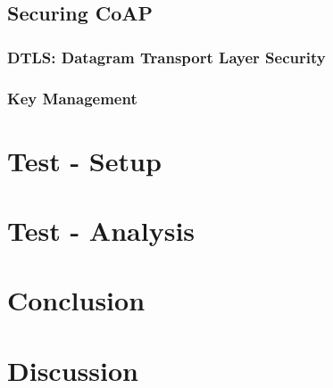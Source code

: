 \documentclass[11pt]{book}
\begin{document}
\section{Securing CoAP}
\subsection{DTLS: Datagram Transport Layer Security}
\subsection{Key Management}
\chapter{Test - Setup}
\chapter{Test - Analysis}
\chapter{Conclusion}
\chapter{Discussion}
\end{document}
